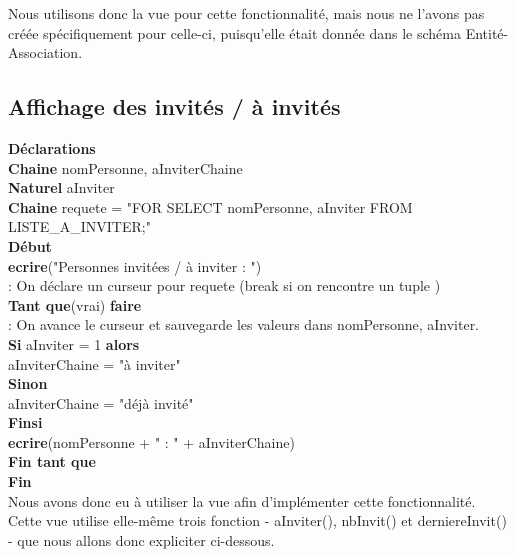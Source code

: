 \documentclass[a4paper,10pt]{report}
\begin{document}
Nous utilisons donc la vue  pour cette fonctionnalité, mais nous ne l'avons pas créée spécifiquement pour celle-ci, puisqu'elle était donnée dans le schéma Entité-Association.

\subsection{Affichage des invités / à invités}

\textbf{Déclarations}\\
	\indent\indent\textbf{Chaine} nomPersonne, aInviterChaine \\
	\indent\indent\textbf{Naturel} aInviter \\	
	\indent\indent\textbf{Chaine} requete = "FOR SELECT nomPersonne, aInviter FROM LISTE\_A\_INVITER;"\\

\textbf{Début}\\
	\indent\indent \textbf{ecrire}("Personnes invitées / à inviter : ")\\
	\indent\indent {} : On déclare un curseur pour requete (break si on rencontre un tuple )\\
	\indent\indent\textbf{Tant que}(vrai) \textbf{faire}\\
		\indent\indent\indent {} : On avance le curseur et sauvegarde les valeurs dans nomPersonne, aInviter.\\
		\indent\indent\indent \textbf{Si} aInviter = 1 \textbf{alors}\\
			\indent\indent\indent\indent aInviterChaine = "à inviter"\\
		\indent\indent\indent \textbf{Sinon}\\
			\indent\indent\indent\indent aInviterChaine = "déjà invité"\\
		\indent\indent\indent \textbf{Finsi}\\
		\indent\indent\indent \textbf{ecrire}(nomPersonne + " : " + aInviterChaine)\\
	\indent\indent\textbf{Fin tant que}\\	
\indent\textbf{Fin}\\	

Nous avons donc eu à utiliser la vue  afin d'implémenter cette fonctionnalité. Cette vue utilise elle-même trois fonction  - aInviter(), nbInvit() et derniereInvit() - que nous allons donc expliciter ci-dessous.
\end{document}
